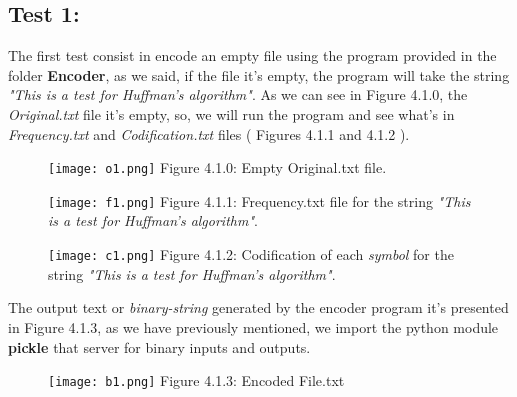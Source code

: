 \subsection{Test 1:}

The first test consist in encode an empty file using the program provided in the folder {\bfseries Encoder}, as we said, if the file it's empty, the program will take the string {\itshape "This is a test for Huffman's algorithm"}. As we can see in Figure 4.1.0, the {\itshape Original.txt} file it's empty, so, we will run the program and see what's in {\itshape Frequency.txt} and {\itshape Codification.txt} files ( Figures 4.1.1 and 4.1.2 ). \hfill \break

\begin{figure}[H]
\texttt{[image: o1.png]}
\centering \linebreak \linebreak Figure 4.1.0: Empty Original.txt file.
\end{figure} \hfill \break

\begin{multicols}{2}
\begin{figure}[H]
\texttt{[image: f1.png]}
\centering \linebreak \linebreak Figure 4.1.1: Frequency.txt file for the string {\itshape "This is a test for Huffman's algorithm"}.
\end{figure} \hfill \break

\begin{figure}[H]
\texttt{[image: c1.png]}
\centering \linebreak \linebreak Figure 4.1.2: Codification of each {\itshape symbol} for the string {\itshape "This is a test for Huffman's algorithm"}.
\end{figure} \hfill \break
\end{multicols} 

The output text or {\itshape binary-string} generated by the encoder program it's presented in Figure 4.1.3, as we have previously mentioned, we import the python module {\bfseries pickle} that server for binary inputs and outputs. \hfill \break

\begin{figure}[H]
\texttt{[image: b1.png]}
\centering \linebreak \linebreak Figure 4.1.3: Encoded File.txt 
\end{figure} \hfill \break

